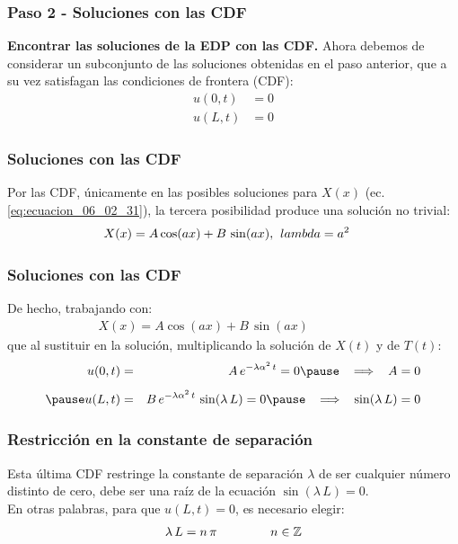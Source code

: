 \documentclass[12pt]{beamer}
\begin{document}
\begin{frame}
\frametitle{Paso 2 - Soluciones con las CDF}
\textbf{Encontrar las soluciones de la EDP con las CDF.}
\pause
Ahora debemos de considerar un subconjunto de las soluciones obtenidas en el paso anterior, que a su vez satisfagan las condiciones de frontera (CDF):
\pause
\begin{align*}
u (0, t) &= 0 \\[0.5em]
u (L, t) &= 0
\end{align*}
\end{frame}
\begin{frame}
\frametitle{Soluciones con las CDF}
Por las CDF, únicamente en las posibles soluciones para $X(x)$ (ec. \ref{eq:ecuacion_06_02_31}), la tercera posibilidad produce una solución no trivial:
\pause
\begin{align*}
X (x) = A \cos (a x ) + B \, \sin (a x), & \hspace{0.2cm} lambda = a^{2}
\end{align*}
\end{frame}
\begin{frame}
\frametitle{Soluciones con las CDF}
De hecho, trabajando con:
\pause
\begin{align*}
X (x) = A \cos (a x) + B \, \sin (a x) \hspace{2cm}
\end{align*}
\pause
que al sustituir en la solución, multiplicando la solución de $X (t)$ y de $T (t)$:
\begin{eqnarray*}
u (0, t) &=& A \, e^{-\lambda \alpha^{2} \, t} = 0 \pause \hspace{0.3cm} \Longrightarrow \hspace{0.3cm} A = 0 \\[0.5em] \pause
u (L, t) &=& B \, e^{-\lambda \alpha^{2} \, t} \, \sin (\lambda \, L) = 0 \pause \hspace{0.3cm} \Longrightarrow \hspace{0.3cm} \sin (\lambda \, L) = 0
\end{eqnarray*}
\end{frame}
\begin{frame}
\frametitle{Restricción en la constante de separación}
Esta última CDF restringe la constante de separación $\lambda$ de ser cualquier número distinto de cero, debe ser una raíz de la ecuación $\sin (\lambda \, L) = 0$.
\\
\bigskip
\pause
En otras palabras, para que $u (L, t) = 0$, es necesario elegir:
\pause
\begin{align}
\lambda \, L = n \, \pi \hspace{1.5cm} n \in \mathbb{Z}
\label{eq:ecuacion_06_02_34}    
\end{align}
\end{frame}
\end{document}
